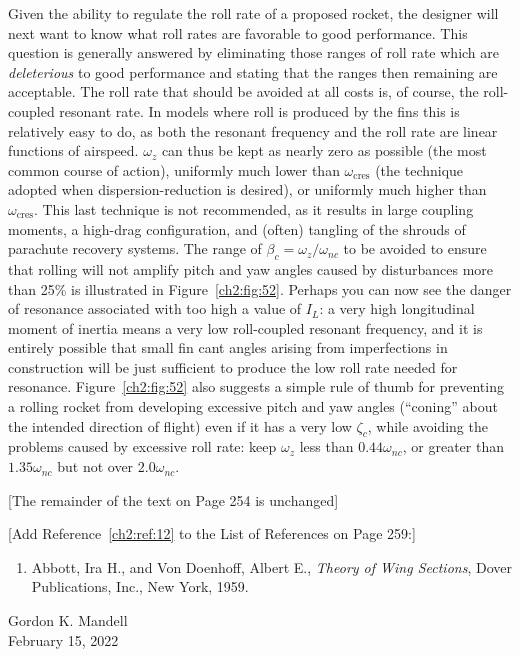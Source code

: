 Given the ability to regulate the roll rate of a proposed rocket, the designer will next want to
know what roll rates are favorable to good performance. This question is generally answered by
eliminating those ranges of roll rate which are \emph{deleterious} to good performance and
stating that the ranges then remaining are acceptable. The roll rate that should be avoided at
all costs is, of course, the roll-coupled resonant rate. In models where roll is produced by the
fins this is relatively easy to do, as both the resonant frequency and the roll rate are linear
functions of airspeed. $\omega_z$ can thus be kept as nearly zero as possible (the most common
course of action), uniformly much lower than $\omega_{\mathrm{cres}}$ (the technique adopted when
dispersion-reduction is desired), or uniformly much higher than $\omega_{\mathrm{cres}}$. This last
technique is not recommended, as it results in large coupling moments, a high-drag configuration,
and (often) tangling of the shrouds of parachute recovery systems. The range of
$\beta_c = \omega_z/\omega_{nc}$ to be avoided to ensure that rolling will not amplify pitch and
yaw angles caused by disturbances more than 25\% is illustrated in Figure~\ref{ch2:fig:52}.
Perhaps you can now see the danger of resonance associated with too high a value of $I_L$: a very
high longitudinal moment of inertia means a very low roll-coupled resonant frequency, and it is
entirely possible that small fin cant angles arising from imperfections in construction will be
just sufficient to produce the low roll rate needed for resonance. Figure~\ref{ch2:fig:52} also
suggests a simple rule of thumb for preventing a rolling rocket from developing excessive pitch
and yaw angles (``coning'' about the intended direction of flight) even if it has a very low
$\zeta_c$, while avoiding the problems caused by excessive roll rate: keep $\omega_z$ less than
$0.44\omega_{nc}$, or greater than $1.35\omega_{nc}$ but not over $2.0\omega_{nc}$.

\begin{center}
[The remainder of the text on Page 254 is unchanged]
\end{center}

\bigskip
\begin{center}
[Add Reference~\ref{ch2:ref:12} to the List of References on Page 259:]
\end{center}

\begin{enumerate}[label=\arabic*.,start=12,leftmargin=*]
  \item Abbott, Ira H., and Von Doenhoff, Albert E., \emph{Theory of Wing Sections}, Dover
  Publications, Inc., New York, 1959.
\end{enumerate}

\bigskip
\noindent Gordon K. Mandell\\
February 15, 2022
